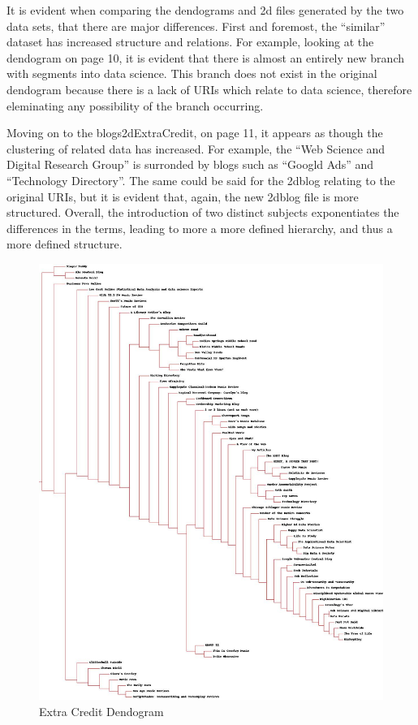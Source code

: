\documentclass[11pt]{scrartcl} %
\begin{document}
\tabto{2.0cm} It is evident when comparing the dendograms and 2d files generated by the two data sets, that there are major differences. First and foremost, the ``similar'' dataset has increased structure and relations. For example, looking at the dendogram on page 10, it is evident that there is almost an entirely new branch with segments into data science. This branch does not exist in the original dendogram because there is a lack of URIs which relate to data science, therefore eleminating any possibility of the branch occurring. \newline \newline

\tabto{2.0cm} Moving on to the blogs2dExtraCredit, on page 11, it appears as though the clustering of related data has increased. For example, the ``Web Science and Digital Research Group'' is surronded by blogs such as ``Googld Ads'' and ``Technology Directory''. The same could be said for the 2dblog relating to the original URIs, but it is evident that, again, the new 2dblog file is more structured. Overall, the introduction of two distinct subjects exponentiates the differences in the terms, leading to more a more defined hierarchy, and thus a more defined structure.

\begin{figure}[p]%
        \includegraphics[width=.99\textwidth,height=.99\textheight]{../Figures/blogclustExtra.jpg}%
        \caption{Extra Credit Dendogram}
    \end{figure}%
\end{document}
